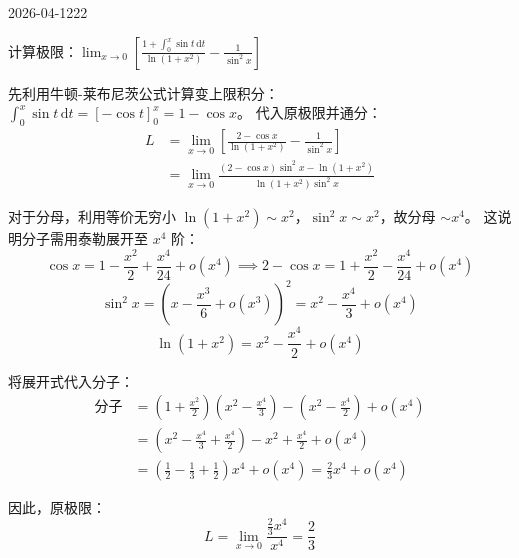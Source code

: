 \begin{mistake}{2026-04-12}{22}

\begin{problemcontent}
计算极限：\(\displaystyle \lim_{x \to 0} \left[ \frac{1+\int_0^x \sin t \,\mathrm{d}t}{\ln(1+x^2)} - \frac{1}{\sin^2 x} \right]\)
\end{problemcontent}

\begin{solutioncontent}
先利用牛顿-莱布尼茨公式计算变上限积分：
\(\int_0^x \sin t \,\mathrm{d}t = [-\cos t]_0^x = 1 - \cos x\)。
代入原极限并通分：
\[
\begin{aligned}
L &= \lim_{x \to 0} \left[ \frac{2 - \cos x}{\ln(1+x^2)} - \frac{1}{\sin^2 x} \right] \\
&= \lim_{x \to 0} \frac{(2-\cos x)\sin^2 x - \ln(1+x^2)}{\ln(1+x^2) \sin^2 x}
\end{aligned}
\]

对于分母，利用等价无穷小 \(\ln(1+x^2) \sim x^2\)，\(\sin^2 x \sim x^2\)，故分母 \(\sim x^4\)。
这说明分子需用泰勒展开至 \(x^4\) 阶：
\[
\cos x = 1 - \frac{x^2}{2} + \frac{x^4}{24} + o(x^4) \implies 2-\cos x = 1 + \frac{x^2}{2} - \frac{x^4}{24} + o(x^4)
\]
\[
\sin^2 x = \left(x - \frac{x^3}{6} + o(x^3)\right)^2 = x^2 - \frac{x^4}{3} + o(x^4)
\]
\[
\ln(1+x^2) = x^2 - \frac{x^4}{2} + o(x^4)
\]

将展开式代入分子：
\[
\begin{aligned}
\text{分子} &= \left( 1 + \frac{x^2}{2} \right)\left( x^2 - \frac{x^4}{3} \right) - \left( x^2 - \frac{x^4}{2} \right) + o(x^4) \\
&= \left( x^2 - \frac{x^4}{3} + \frac{x^4}{2} \right) - x^2 + \frac{x^4}{2} + o(x^4) \\
&= \left(\frac{1}{2} - \frac{1}{3} + \frac{1}{2}\right)x^4 + o(x^4) = \frac{2}{3}x^4 + o(x^4)
\end{aligned}
\]

因此，原极限：
\[
L = \lim_{x \to 0} \frac{\frac{2}{3}x^4}{x^4} = \frac{2}{3}
\]
\end{solutioncontent}


\end{mistake}
